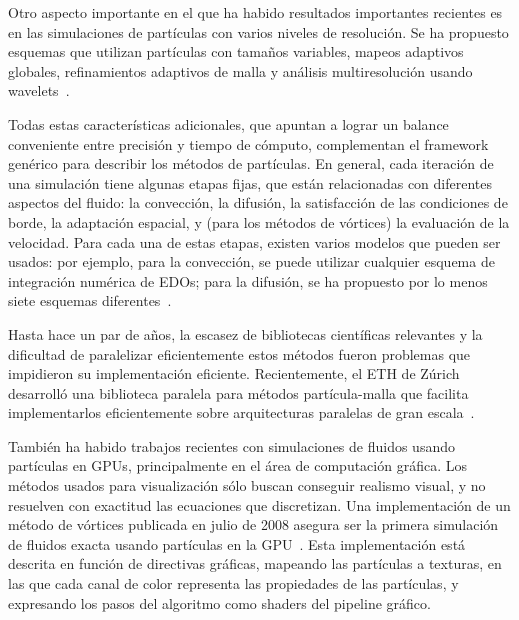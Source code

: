 \documentclass[11pt,spanish]{article}
\newcommand{\vel}{\mathbf{u}}
\newcommand{\vort}{\mathbf{\omega}}
\begin{document}
Otro aspecto importante en el que ha habido resultados importantes recientes es
en las simulaciones de partículas con varios niveles de resolución.
Se ha propuesto esquemas que utilizan
partículas con tamaños variables,
mapeos adaptivos globales,
refinamientos adaptivos de malla
y análisis multiresolución usando wavelets~\cite{multiresolution}.

Todas estas características adicionales, que apuntan a lograr un balance
conveniente entre precisión y tiempo de cómputo, complementan el framework 
genérico para describir los métodos de partículas.  En general, cada iteración
de una simulación tiene algunas etapas fijas, que están relacionadas con
diferentes aspectos del fluido: la convección, la difusión, la satisfacción de
las condiciones de borde, la adaptación espacial, y (para los métodos de vórtices)
la evaluación de la velocidad.  Para cada una de estas etapas, existen varios
modelos que pueden ser usados:  por ejemplo, para la convección, se puede
utilizar cualquier esquema de integración numérica de EDOs;  para la difusión, 
se ha propuesto por lo menos siete esquemas diferentes~\cite[\S1.2]{barba}.

Hasta hace un par de años, la escasez de bibliotecas científicas relevantes y la
dificultad de paralelizar eficientemente estos métodos fueron problemas que
impidieron su implementación eficiente.  Recientemente, el ETH de Zúrich desarrolló una
biblioteca paralela para métodos partícula-malla que facilita implementarlos
eficientemente sobre arquitecturas paralelas de gran escala~\cite{ppm}.

También ha habido trabajos recientes con simulaciones de fluidos usando partículas
en GPUs, principalmente en el área de computación gráfica.  Los métodos usados
para visualización sólo buscan conseguir realismo visual, y no resuelven con
exactitud las ecuaciones que discretizan.  Una implementación de un método de
vórtices publicada en julio de 2008 asegura ser la primera simulación de fluidos
exacta usando partículas en la GPU~\cite{vortex-gpu}.  Esta implementación está
descrita en función de directivas gráficas, mapeando las partículas a texturas,
en las que cada canal de color representa las propiedades de las partículas, y
expresando los pasos del algoritmo como shaders del pipeline gráfico.

\end{document}
